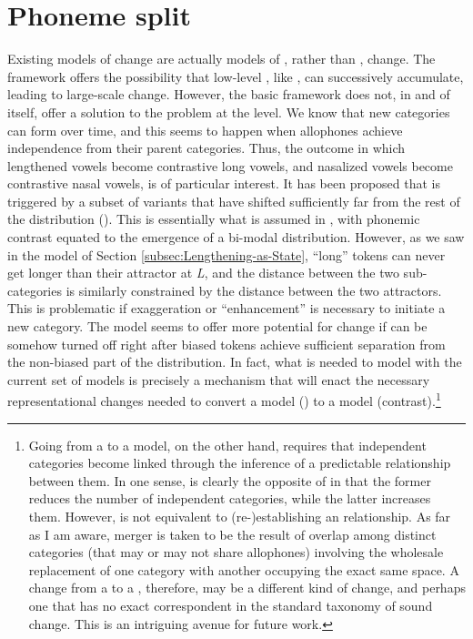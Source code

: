\section{\label{subsec:Phoneme-Split}Phoneme split}

Existing  models of change are actually models of ,
rather than , change. The framework offers the possibility
that low-level , like  , can
successively accumulate, leading to large-scale change. However, the
basic framework does not, in and of itself, offer a solution to the
 problem at the  level. We know that new 
categories can form over time, and this seems to happen when 
allophones achieve independence from their parent categories. Thus,
the outcome in which lengthened vowels become contrastive long vowels,
and nasalized vowels become contrastive nasal vowels, is of particular
interest. It has been proposed that  is triggered by
a subset of  variants that have shifted sufficiently far from
the rest of the distribution (\citealt{Janda2003,Janda2008}). This
is essentially what is assumed in \citet{Wedel2008}, with phonemic
contrast equated to the emergence of a bi-modal distribution. However,
as we saw in the  model of Section \ref{subsec:Lengthening-as-State},
``long'' tokens can never get longer than their attractor at \emph{L},
and the distance between the two sub-categories is similarly constrained
by the distance between the two attractors. This is problematic if
 exaggeration or “enhancement” is necessary to initiate
a new  category. The  model seems to offer
more potential for  change if  can be somehow
turned off right after biased tokens achieve sufficient separation
from the non-biased part of the distribution. In fact, what is needed
to model  with the current set of models is precisely
a mechanism that will enact the necessary representational changes
needed to convert a  model () to a 
model (contrast).\footnote{Going from a  to a  model, on the other
hand, requires that independent categories become linked through the
inference of a predictable relationship between them. In one sense,
 is clearly the opposite of  in that the
former reduces the number of independent categories, while the latter
increases them. However,  is not equivalent to (re-)establishing
an  relationship. As far as I am aware, merger is taken
to be the result of  overlap among distinct categories (that
may or may not share allophones) involving the wholesale replacement
of one category with another occupying the exact same  space.
A change from a  to a , therefore, may be
a different kind of change, and perhaps one that has no exact correspondent
in the standard taxonomy of sound change. This is an intriguing avenue
for future work.}

